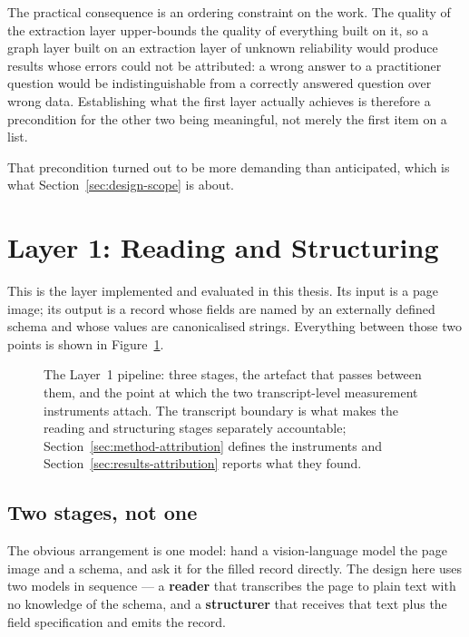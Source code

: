 The practical consequence is an ordering constraint on the work. The quality of the extraction
layer upper-bounds the quality of everything built on it, so a graph layer built on an
extraction layer of unknown reliability would produce results whose errors could not be
attributed: a wrong answer to a practitioner question would be indistinguishable from a
correctly answered question over wrong data. Establishing what the first layer actually
achieves is therefore a precondition for the other two being meaningful, not merely the first
item on a list.

That precondition turned out to be more demanding than anticipated, which is what
Section~\ref{sec:design-scope} is about.

\section{Layer 1: Reading and Structuring}
\label{sec:design-layer1}

This is the layer implemented and evaluated in this thesis. Its input is a page image; its
output is a record whose fields are named by an externally defined schema and whose values
are canonicalised strings. Everything between those two points is shown in
Figure~\ref{fig:pipeline}.

\begin{figure}[htbp]
  \centering
  
  \caption[The Layer~1 pipeline]{The Layer~1 pipeline: three stages, the artefact that
  passes between them, and the point at which the two transcript-level measurement
  instruments attach. The transcript boundary is what makes the reading and structuring
  stages separately accountable; Section~\ref{sec:method-attribution} defines the instruments
  and Section~\ref{sec:results-attribution} reports what they found.}
  \label{fig:pipeline}
\end{figure}

\subsection{Two stages, not one}
\label{sec:design-two-stage}

The obvious arrangement is one model: hand a vision-language model the page image and a
schema, and ask it for the filled record directly. The design here uses
two models in sequence --- a \textbf{reader} that transcribes the page to plain text with no
knowledge of the schema, and a \textbf{structurer} that receives that text plus the field
specification and emits the record.

